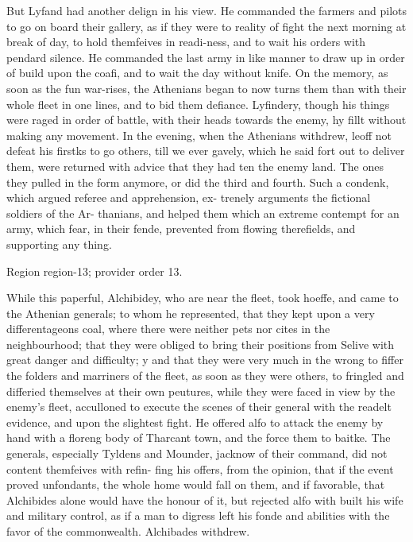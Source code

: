 \documentclass[11pt]{article}
\begin{document}
But Lyfand had another delign in his view. He commanded the farmers and pilots to go on board their gallery, as if they were to reality of fight the next morning at break of day, to hold themfeives in readi-ness, and to wait his orders with pendard silence. He commanded the last army in like manner to draw up in order of build upon the coafi, and to wait the day without knife. On the memory, as soon as the fun war-rises, the Athenians began to now turns them than with their whole fleet in one lines, and to bid them defiance. Lyfindery, though his things were raged in order of battle, with their heads towards the enemy, hy fillt without making any movement. In the evening, when the Athenians withdrew, leoff not defeat his firstks to go others, till we ever gavely, which he said fort out to deliver them, were returned with advice that they had ten the enemy land. The ones they pulled in the form anymore, or did the third and fourth. Such a condenk, which argued referee and apprehension, ex- trenely arguments the fictional soldiers of the Ar- thanians, and helped them which an extreme contempt for an army, which fear, in their fende, prevented from flowing therefields, and supporting any thing.
\par

{\scriptsize\color{gray} Region region-13; provider order 13.\par}
\medskip

While this paperful, Alchibidey, who are near the fleet, took hoeffe, and came to the Athenian generals; to whom he represented, that they kept upon a very differentageons coal, where there were neither pets nor cites in the neighbourhood; that they were obliged to bring their positions from Selive with great danger and difficulty; y and that they were very much in the wrong to fiffer the folders and marriners of the fleet, as soon as they were others, to fringled and differied themselves at their own peutures, while they were faced in view by the enemy’s fleet, acculloned to execute the scenes of their general with the readelt evidence, and upon the slightest fight. He offered alfo to attack the enemy by hand with a floreng body of Tharcant town, and the force them to baitke. The generals, especially Tyldens and Mounder, jacknow of their command, did not content themfeives with refin- fing his offers, from the opinion, that if the event proved unfondants, the whole home would fall on them, and if favorable, that Alchibides alone would have the honour of it, but rejected alfo with built his wife and military control, as if a man to digress left his fonde and abilities with the favor of the commonwealth. Alchibades withdrew.
\par
\end{document}

